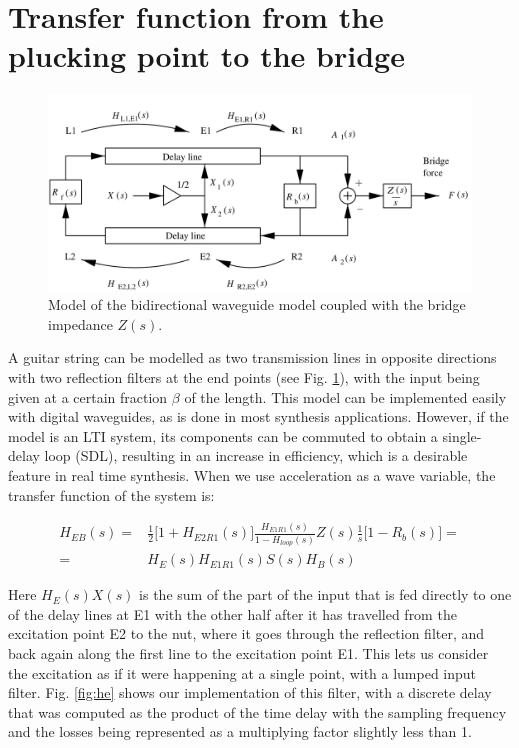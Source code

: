\documentclass[a4paper]{article}
\begin{document}
\section{Transfer function from the plucking point to the bridge}

\begin{figure}[h]
	\centering
	\includegraphics[width=0.7\linewidth]{synth.png}
	\caption{Model of the bidirectional waveguide model coupled with the bridge impedance $Z(s)$.}
	\label{fig:dwg}
\end{figure}

A guitar string can be modelled as two transmission lines in opposite directions with two reflection filters at the end points (see Fig. \ref{fig:dwg}), with the input being given at a certain fraction $\beta$ of the length. This model can be implemented easily with digital waveguides, as is done in most synthesis applications.  However, if the model is an LTI system, its components can be commuted to obtain a single-delay loop (SDL), resulting in an increase in efficiency, which is a desirable feature in real time synthesis\cite{kar98}. When we use acceleration as a wave variable, the transfer function of the system is:

\begin{align*}
	H_{EB}(s) = &\frac{1}{2}\biggl[ 1 + H_{E2R1}(s) \biggr] \frac{H_{E1R1}(s)}{1 - H_{loop}(s)} Z(s) \frac{1}{s} \biggl[ 1 - R_b(s) \biggr] = \\[5pt] =~ &H_E (s) H_{E1R1}(s) S(s) H_B(s) 
\end{align*}

Here $H_E(s)X(s)$ is the sum of the part of the input that is fed directly to one of the delay lines at E1 with the other half after it has travelled from the excitation point E2 to the nut, where it goes through the reflection filter, and back again along the first line to the excitation point E1. This lets us consider the excitation as if it were happening at a single point, with a lumped input filter. Fig. \ref{fig:he} shows our implementation of this filter, with a discrete delay that was computed as the product of the time delay with the sampling frequency and the losses being represented as a multiplying factor slightly less than 1.
\end{document}
